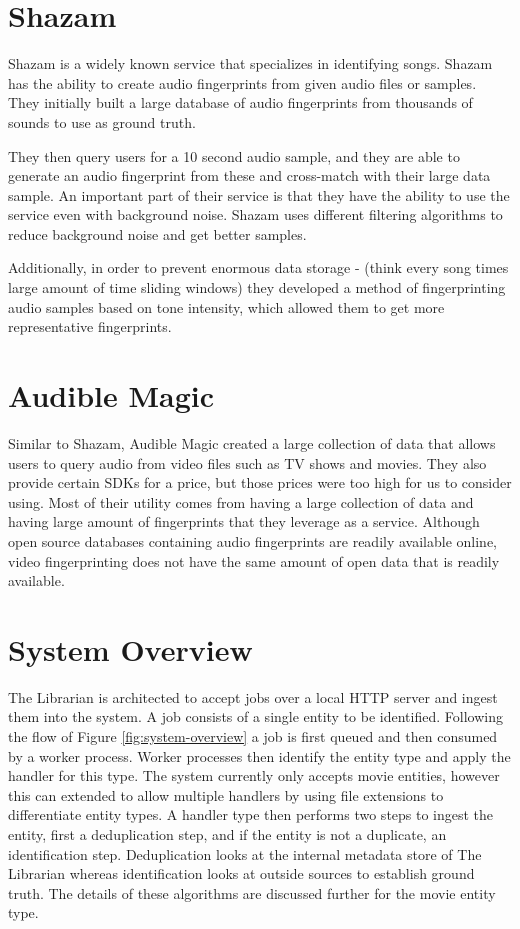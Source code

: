 \documentclass[paper=a4, fontsize=11pt]{scrartcl} %
\numberwithin{equation}{section} %
\numberwithin{figure}{section} %
\numberwithin{table}{section} %
\begin{document}
\section{Shazam}
\label{sec:shazam}

Shazam is a widely known service that specializes in identifying songs. Shazam has the ability to create audio fingerprints from given audio files or samples. They initially built a large database of audio fingerprints from thousands of sounds to use as ground truth. 

They then query users for a 10 second audio sample, and they are able to generate an audio fingerprint from these and cross-match with their large data sample. An important part of their service is that they have the ability to use the service even with background noise. Shazam uses different filtering algorithms to reduce background noise and get better samples. 

Additionally, in order to prevent enormous data storage - (think every song times large amount of time sliding windows) they developed a method of fingerprinting audio samples based on tone intensity, which allowed them to get more representative fingerprints.

\section{Audible Magic}
\label{sec:audible-magic}

Similar to Shazam, Audible Magic created a large collection of data that allows users to query audio from video files such as TV shows and movies. They also provide certain SDKs for a price, but those prices were too high for us to consider using. Most of their utility comes from having a large collection of data and having large amount of fingerprints that they leverage as a service. Although open source databases containing audio fingerprints are readily available online, video fingerprinting does not have the same amount of open data that is readily available.



\section{System Overview}
\label{sec:system-overview}
The Librarian is architected to accept jobs over a local HTTP server and ingest them into the system. A job consists of a single entity to be identified. Following the flow of Figure \ref{fig:system-overview} a job is first queued and then consumed by a worker process. Worker processes then identify the entity type and apply the handler for this type. The system currently only accepts movie entities, however this can extended to allow multiple handlers by using file extensions to differentiate entity types. A handler type then performs two steps to ingest the entity, first a deduplication step, and if the entity is not a duplicate, an identification step. Deduplication looks at the internal metadata store of The Librarian whereas identification looks at outside sources to establish ground truth. The details of these algorithms are discussed further for the movie entity type. \\
\end{document}
